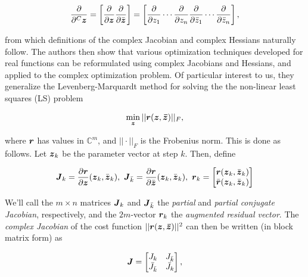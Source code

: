 \documentclass[useAMS,usenatbib]{mn2e}
\newcommand{\COMPLEX}{\mathbb{C}}
\newcommand{\zz}{\bmath{z}}
\newcommand{\mat}[1]{{\bmath{#1}}}
\newcommand{\JJ}{\mat{J}} %
\begin{document}
\[
\frac{\partial}{\partial^C \zz} = \left [ \frac{\partial}{\partial \zz} \frac{\partial}{\partial \bar{\zz}} \right ] = \left [ \frac{\partial}{\partial z_1} \cdots \frac{\partial}{\partial z_n}
\frac{\partial}{\partial \bar{z}_1} \cdots \frac{\partial}{\partial \bar{z}_n} \right ],
\]

from which definitions of the complex Jacobian and complex Hessians naturally follow. The authors then show 
that various optimization techniques developed for real functions can be reformulated using 
complex Jacobians and Hessians, and applied to the complex optimization problem. Of particular interest to 
us, they generalize the Levenberg-Marquardt method for solving the the non-linear least squares (LS) problem

\begin{equation}
\label{eq:LSmin}
\min_{\bmath{z}} ||\bmath{r}(\bmath{z},\bmath{\bar z})||_F,
\end{equation}

where $\bmath{r}$ has values in $\COMPLEX^m$, and $||\cdot||_F$ is the Frobenius norm. This is done as follows.
Let $\zz_k$ be the parameter vector at step $k$. Then, define

\newcommand{\Matrix}[2]{\left [ \begin{array}{@{}#1@{}}#2\end{array} \right ]}
\newcommand{\Stack}[1]{\begin{array}{@{}c@{}}#1\end{array}}

\begin{equation}
\label{eq:Jk}
\JJ_k=\frac{\partial \bmath{r}}{\partial \zz} (\zz_k,\bar{\zz}_k), ~\JJ_{\bar{k}}=\frac{\partial \bmath{r}}{\partial \bar{\zz}}(\zz_k,\bar{\zz}_k),~\bmath{r}_k=\Matrix{c}{\bmath{r}(\zz_k,\bar{\zz}_k)\\\bar{\bmath{r}}(\zz_k,\bar{\zz}_k)}
\end{equation}

We'll call the $m\times n$ matrices $\JJ_k$ and $\JJ_{\bar{k}}$ the \emph{partial} and \emph{partial conjugate Jacobian}, respectively, 
and the $2m$-vector $\bmath{r}_k$ the \emph{augmented residual vector}. The \emph{complex Jacobian} 
of the cost function $||\bmath{r}(\bmath{z},\bmath{\bar z})||^2$ can then be written (in block matrix form) as

\begin{equation}
\label{eq:JJ}
\JJ = \Matrix{cc}{J_k & J_{\bar{k}} \\ \bar{J}_{\bar{k}} & \bar{J}_k },
\end{equation}
\end{document}
